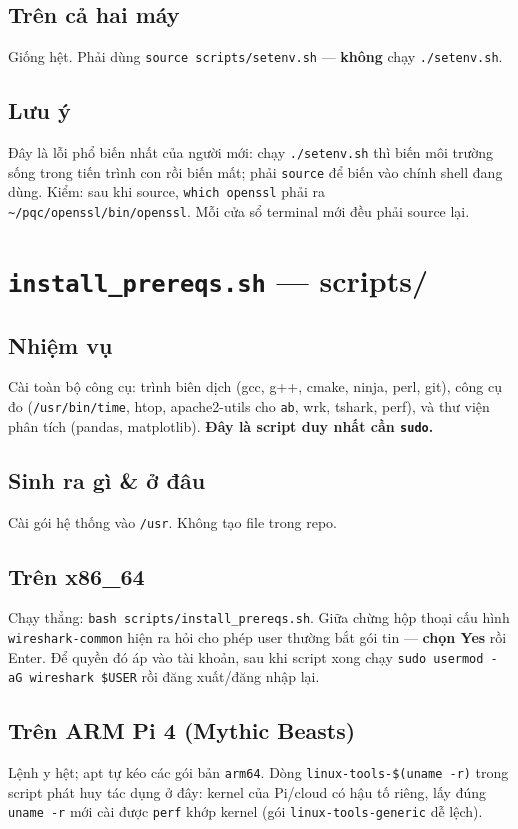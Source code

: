 \documentclass[11pt,a4paper]{article}
\begin{document}
\subsection*{Trên cả hai máy}
Giống hệt. Phải dùng \verb|source scripts/setenv.sh| — \textbf{không} chạy \verb|./setenv.sh|.

\subsection*{Lưu ý}
Đây là lỗi phổ biến nhất của người mới: chạy \verb|./setenv.sh| thì biến môi trường sống trong tiến trình con rồi biến mất; phải \verb|source| để biến vào chính shell đang dùng. Kiểm: sau khi source, \verb|which openssl| phải ra \verb|~/pqc/openssl/bin/openssl|. Mỗi cửa sổ terminal mới đều phải source lại.

\section{\texttt{install\_prereqs.sh} — \textmd{\normalsize scripts/}}

\subsection*{Nhiệm vụ}
Cài toàn bộ công cụ: trình biên dịch (gcc, g++, cmake, ninja, perl, git), công cụ đo (\verb|/usr/bin/time|, htop, apache2-utils cho \verb|ab|, wrk, tshark, perf), và thư viện phân tích (pandas, matplotlib). \textbf{Đây là script duy nhất cần \texttt{sudo}.}

\subsection*{Sinh ra gì \& ở đâu}
Cài gói hệ thống vào \verb|/usr|. Không tạo file trong repo.

\subsection*{Trên x86\_64}
Chạy thẳng: \verb|bash scripts/install_prereqs.sh|. Giữa chừng hộp thoại cấu hình \verb|wireshark-common| hiện ra hỏi cho phép user thường bắt gói tin — \textbf{chọn Yes} rồi Enter. Để quyền đó áp vào tài khoản, sau khi script xong chạy \verb|sudo usermod -aG wireshark $USER| rồi đăng xuất/đăng nhập lại.

\subsection*{Trên ARM Pi 4 (Mythic Beasts)}
Lệnh y hệt; apt tự kéo các gói bản \verb|arm64|. Dòng \verb|linux-tools-$(uname -r)| trong script phát huy tác dụng ở đây: kernel của Pi/cloud có hậu tố riêng, lấy đúng \verb|uname -r| mới cài được \verb|perf| khớp kernel (gói \verb|linux-tools-generic| dễ lệch).
\end{document}
